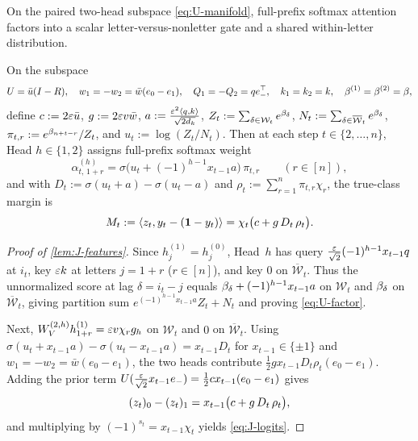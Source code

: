 On the paired two-head subspace \cref{eq:U-manifold}, full-prefix softmax attention factors into a scalar letter-versus-nonletter gate and a shared within-letter distribution.

\begin{lemma}
\label{lem:J-features}
\label{lem:U-features}
On the subspace
\begin{equation}
 U = \bar u(I - R), \quad w_1 = -w_2 = \bar w(e_0 - e_1), \quad Q_1 = -Q_2 = q e_-^\top, \quad k_1 = k_2 = k, \quad \beta^{(1)} = \beta^{(2)} = \beta,
 \label{eq:U-manifold}
\end{equation}
define $c := 2\varepsilon\bar u$, $g := 2\varepsilon v\bar w$, $a := \frac{\varepsilon^2\langle q, k\rangle}{\sqrt{2d_k}}$, $Z_t := \sum_{\delta\in\mathcal W_t} e^{\beta_\delta}$, $N_t := \sum_{\delta\in\overline{\mathcal W}_t} e^{\beta_\delta}$, $\pi_{t,r} := e^{\beta_{n+t-r}}/Z_t$, and $u_t := \log(Z_t/N_t)$. Then at each step $t \in \{2,\ldots,n\}$, Head $h \in \{1,2\}$ assigns full-prefix softmax weight
\begin{equation}
 \alpha^{(h)}_{t,\,1+r} = \sigma\bigl(u_t + (-1)^{h-1}x_{t-1}a\bigr)\,\pi_{t,r} \qquad (r \in [n]),
 \label{eq:U-factor}
\end{equation}
and with $D_t := \sigma(u_t + a) - \sigma(u_t - a)$ and $\rho_t := \sum_{r=1}^n \pi_{t,r}\chi_r$, the true-class margin is
\begin{equation}
 M_t := \left\langle z_t,y_t - (\mathbf 1 - y_t)\right\rangle = \chi_t\bigl(c + g\,D_t\,\rho_t\bigr).
 \label{eq:J-logits}
\end{equation}
\end{lemma}
\begin{proof}[Proof of \cref{lem:J-features}]
Since $h^{(1)}_j = h^{(0)}_j$, Head~$h$ has query $\frac{\varepsilon}{\sqrt 2}(-1)^{h-1}x_{t-1}q$ at $i_t$, key $\varepsilon k$ at letters $j = 1+r$ ($r \in [n]$), and key $0$ on $\overline{\mathcal W}_t$. Thus the unnormalized score at lag $\delta = i_t - j$ equals $\beta_\delta + (-1)^{h-1}x_{t-1}a$ on $\mathcal W_t$ and $\beta_\delta$ on $\overline{\mathcal W}_t$, giving partition sum $e^{(-1)^{h-1}x_{t-1}a}Z_t + N_t$ and proving \cref{eq:U-factor}.

Next, $W_V^{(2,h)}h^{(1)}_{1+r} = \varepsilon v\chi_r g_h$ on $\mathcal W_t$ and $0$ on $\overline{\mathcal W}_t$. Using $\sigma(u_t + x_{t-1}a) - \sigma(u_t - x_{t-1}a) = x_{t-1}D_t$ for $x_{t-1} \in \{\pm 1\}$ and $w_1 = -w_2 = \bar w(e_0 - e_1)$, the two heads contribute $\frac{1}{2}g x_{t-1}D_t\rho_t(e_0 - e_1)$. Adding the prior term $U(\frac{\varepsilon}{\sqrt 2}x_{t-1}e_-) = \frac{1}{2}c x_{t-1}(e_0 - e_1)$ gives
\[
  (z_t)_0 - (z_t)_1 = x_{t-1}\bigl(c + g\,D_t\,\rho_t\bigr),
\]
and multiplying by $(-1)^{s_t} = x_{t-1}\chi_t$ yields \cref{eq:J-logits}.
\end{proof}

